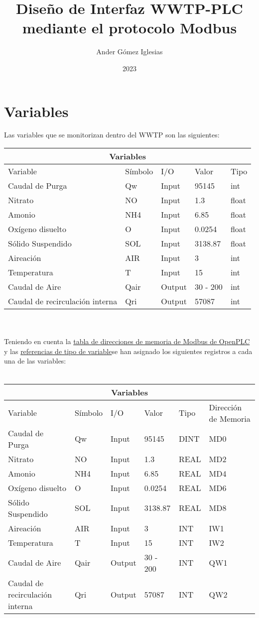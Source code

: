 \documentclass{article}
\title{Diseño de Interfaz WWTP-PLC mediante el protocolo Modbus}
\author{Ander Gómez Iglesias}
\date{2023}
\begin{document}
\maketitle

\section{Variables}
Las variables que se monitorizan dentro del WWTP son las siguientes:\\

\begin{tabular}{ |p{3cm}|p{2cm}|p{2cm}|p{2cm}|p{2cm}|  }
 \hline
 \multicolumn{5}{|c|}{Variables} \\
 \hline
 Variable &Símbolo &I/O &Valor &Tipo\\
 \hline
 Caudal de Purga   & Qw &Input &95145 &int\\
 Nitrato&   NO  & Input   &1.3 &float\\
 Amonio &NH4 &Input &6.85 &float\\
 Oxígeno disuelto &O &Input &0.0254 &float\\
 Sólido Suspendido &SOL &Input &3138.87 &float\\
 Aireación &AIR &Input &3 &int\\
 Temperatura &T &Input &15 &int\\
 Caudal de Aire &Qair &Output &30 - 200 &int\\
 Caudal de recirculación interna &Qri &Output &57087 &int\\
 \hline
\end{tabular}\\\\

Teniendo en cuenta la \href{https://openplcproject.com/docs/2-5-modbus-addressing/}{tabla de direcciones de memoria de Modbus de OpenPLC} y las \href{https://openplcproject.gitlab.io/openplc_v3/iec__types_8h.html}{referencias de tipo de variable}se han asignado los siguientes registros a cada una de las variables:\\\\

\begin{tabular}{ |p{3cm}|p{2cm}|p{2cm}|p{2cm}|p{2cm}|p{2cm}|  }
 \hline
 \multicolumn{6}{|c|}{Variables} \\
 \hline
 Variable &Símbolo &I/O &Valor &Tipo &Dirección de Memoria\\
 \hline
 Caudal de Purga   & Qw &Input &95145 &DINT &MD0\\
 Nitrato&   NO  & Input   &1.3 &REAL &MD2\\
 Amonio &NH4 &Input &6.85 &REAL &MD4\\
 Oxígeno disuelto &O &Input &0.0254 &REAL &MD6\\
 Sólido Suspendido &SOL &Input &3138.87 &REAL &MD8\\
 Aireación &AIR &Input &3 &INT &IW1\\
 Temperatura &T &Input &15 &INT &IW2\\
 Caudal de Aire &Qair &Output &30 - 200 &INT &QW1\\
 Caudal de recirculación interna &Qri &Output &57087 &INT &QW2\\
 \hline
\end{tabular}
\end{document}
